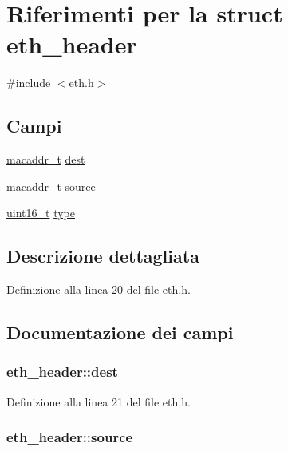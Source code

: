 \hypertarget{structeth__header}{\section{Riferimenti per la struct eth\+\_\+header}
\label{structeth__header}
}


{\ttfamily \#include $<$eth.\+h$>$}

\subsection*{Campi}
\begin{DoxyCompactItemize}
\item 
\hyperlink{netif_8h_a95d524a06a1ff12a314f88bac04db658}{macaddr\+\_\+t} \hyperlink{structeth__header_a60d1b5300409163d627fbe1f033ef3bc}{dest}
\item 
\hyperlink{netif_8h_a95d524a06a1ff12a314f88bac04db658}{macaddr\+\_\+t} \hyperlink{structeth__header_a2f9bf23af31f9234e9ebe6efdf6f38da}{source}
\item 
\hyperlink{aplus_8h_a5a8b2dc9e45a9ee81a94ef304fb62505}{uint16\+\_\+t} \hyperlink{structeth__header_a1f44bfea959183d53e42185c107fa7c0}{type}
\end{DoxyCompactItemize}


\subsection{Descrizione dettagliata}


Definizione alla linea 20 del file eth.\+h.



\subsection{Documentazione dei campi}
\hypertarget{structeth__header_a60d1b5300409163d627fbe1f033ef3bc}{
\subsubsection[{dest}]{ eth\+\_\+header\+::dest}}\label{structeth__header_a60d1b5300409163d627fbe1f033ef3bc}


Definizione alla linea 21 del file eth.\+h.

\hypertarget{structeth__header_a2f9bf23af31f9234e9ebe6efdf6f38da}{
\subsubsection[{source}]{ eth\+\_\+header\+::source}}\label{structeth__header_a2f9bf23af31f9234e9ebe6efdf6f38da}


